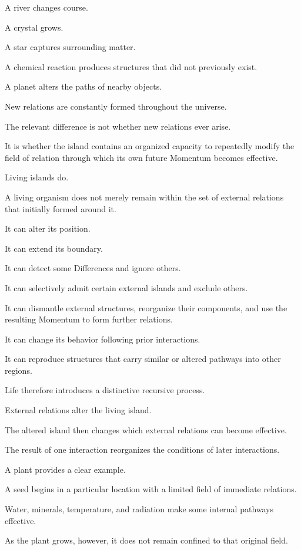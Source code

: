 A river changes course.

A crystal grows.

A star captures surrounding matter.

A chemical reaction produces structures that did not previously exist.

A planet alters the paths of nearby objects.

New relations are constantly formed throughout the universe.

The relevant difference is not whether new relations ever arise.

It is whether the island contains an organized capacity to repeatedly modify the field of relation through which its own future Momentum becomes effective.

Living islands do.

A living organism does not merely remain within the set of external relations that initially formed around it.

It can alter its position.

It can extend its boundary.

It can detect some Differences and ignore others.

It can selectively admit certain external islands and exclude others.

It can dismantle external structures, reorganize their components, and use the resulting Momentum to form further relations.

It can change its behavior following prior interactions.

It can reproduce structures that carry similar or altered pathways into other regions.

Life therefore introduces a distinctive recursive process.

External relations alter the living island.

The altered island then changes which external relations can become effective.

The result of one interaction reorganizes the conditions of later interactions.

A plant provides a clear example.

A seed begins in a particular location with a limited field of immediate relations.

Water, minerals, temperature, and radiation make some internal pathways effective.

As the plant grows, however, it does not remain confined to that original field.

